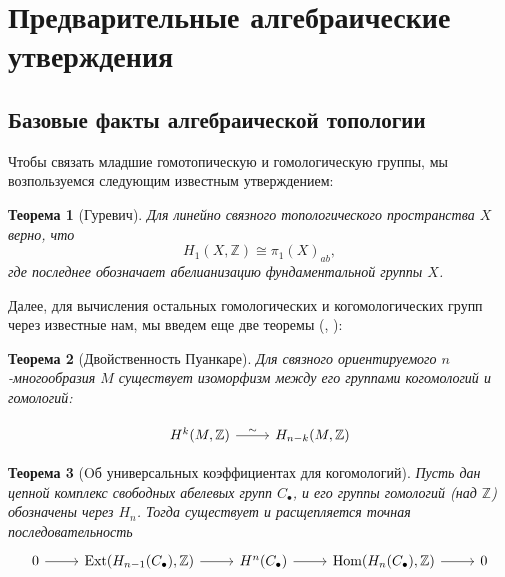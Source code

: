 \documentclass[a4paper, 12pt]{article}
\newtheorem*{theorem}{Теорема}
\theoremstyle{definition}
\begin{document}
\section{Предварительные алгебраические утверждения}

    \subsection{Базовые факты алгебраической топологии}
        Чтобы связать младшие гомотопическую и гомологическую группы, мы возпользуемся следующим известным \cite[Chapter~2,~Section~2.A]{Hatcher2001-hm} утверждением:

        \begin{theorem}[Гуревич]
            Для линейно связного топологического пространства $X$ верно, что
                 \begin{equation*} H_1(X, \mathbb{Z}) \cong \pi_1(X)_{ab}, \end{equation*}
            где последнее обозначает абелианизацию фундаментальной группы $X$.
        \end{theorem}
    
        Далее, для вычисления остальных гомологических и когомологических групп через известные нам, мы введем еще две теоремы (\cite[Chapter~3,~Section~3.3]{Hatcher2001-hm}, \cite[Chapter~3,~Section~3.1]{Hatcher2001-hm}):

        \begin{theorem}[Двойственность Пуанкаре]
            Для связного ориентируемого $n$-многообразия $M$ существует изоморфизм между его группами когомологий и гомологий:
                \[ \begin{tikzcd}
                     H^k(M, \mathbb{Z}) \arrow{r}[label]{\sim} & H_{n - k}(M, \mathbb{Z}) 
                \end{tikzcd} \]
        \end{theorem}

        \begin{theorem}[Oб универсальных коэффициентах для когомологий]
            Пусть дан цепной комплекс свободных абелевых групп $C_\bullet$, и его группы гомологий (над $\mathbb{Z}$) обозначены через $H_n$. Тогда существует и расщепляется точная последовательность
                \[ \begin{tikzcd}
                    0 \arrow{r} & \textnormal{Ext}(H_{n - 1}(C_\bullet), \mathbb{Z}) \arrow{r} & H^n(C_\bullet) \arrow{r} & \textnormal{Hom}(H_n(C_\bullet), \mathbb{Z}) \arrow{r} & 0 
                \end{tikzcd} \]
        \end{theorem}
\end{document}
